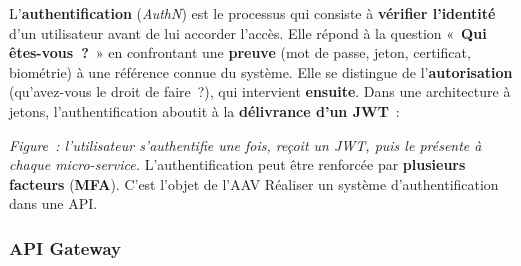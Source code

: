 \noindent L'\textbf{authentification} (\textit{AuthN}) est le processus qui consiste à \textbf{vérifier l'identité} d'un utilisateur avant de lui accorder l'accès. Elle répond à la question «~\textbf{Qui êtes-vous~?}~» en confrontant une \textbf{preuve} (mot de passe, jeton, certificat, biométrie) à une référence connue du système. Elle se distingue de l'\textbf{autorisation} (\og{}qu'avez-vous le droit de faire~?\fg{}), qui intervient \textbf{ensuite}. Dans une architecture à jetons, l'authentification aboutit à la \textbf{délivrance d'un JWT}~:
\begin{center}
\end{center}
\noindent\textit{Figure~: l'utilisateur s'authentifie une fois, reçoit un JWT, puis le présente à chaque micro-service.} L'authentification peut être renforcée par \textbf{plusieurs facteurs} (\textbf{MFA}). C'est l'objet de l'AAV \og{}Réaliser un système d'authentification dans une API\fg{}.

\vspace{0.4cm}

\subsubsection*{API Gateway}
{}

